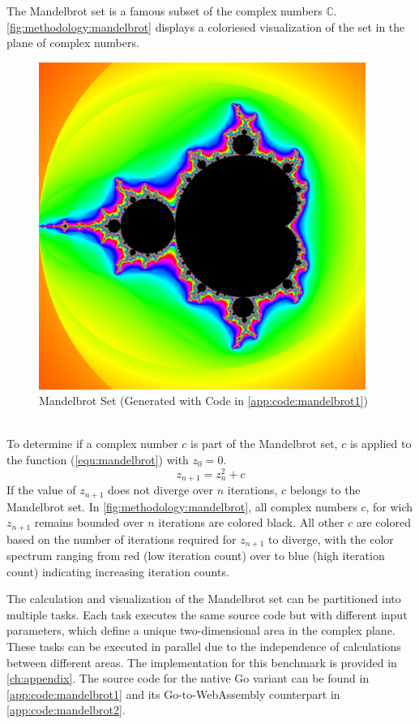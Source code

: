 The Mandelbrot set is a famous subset of the complex numbers $\mathbb{C}$. \autoref{fig:methodology:mandelbrot} displays a coloriesed visualization of the set in the plane of complex numbers.
\begin{figure}[htbp]
  \centering
  \includegraphics[width=0.95\textwidth]{gfx/figures/mandelbrot.png}
  \caption{Mandelbrot Set (Generated with Code in \autoref{app:code:mandelbrot1})}
  \label{fig:methodology:mandelbrot}
\end{figure}
~\\
To determine if a complex number $c$ is part of the Mandelbrot set, $c$ is applied to the function (\ref{equ:mandelbrot}) with $z_{0}=0$.
\begin{equation}
  z_{n+1} = z_{n}^2 + c
  \label{equ:mandelbrot}
\end{equation}
If the value of $z_{n+1}$ does not diverge over $n$ iterations, $c$ belongs to the Mandelbrot set. In \autoref{fig:methodology:mandelbrot}, all complex numbers $c$, for wich $z_{n+1}$ remains bounded over $n$ iterations are colored black. All other $c$ are colored based on the number of iterations required for $z_{n+1}$ to diverge, with the color spectrum ranging from red (low iteration count) over to blue (high iteration count) indicating increasing iteration counts.

The calculation and visualization of the Mandelbrot set can be partitioned into multiple tasks. Each task executes the same source code but with different input parameters, which define a unique two-dimensional area in the complex plane. These tasks can be executed in parallel due to the independence of calculations between different areas. The implementation for this benchmark is provided in \autoref{ch:appendix}. The source code for the native Go variant can be found in \autoref{app:code:mandelbrot1} and its Go-to-WebAssembly counterpart in \autoref{app:code:mandelbrot2}.